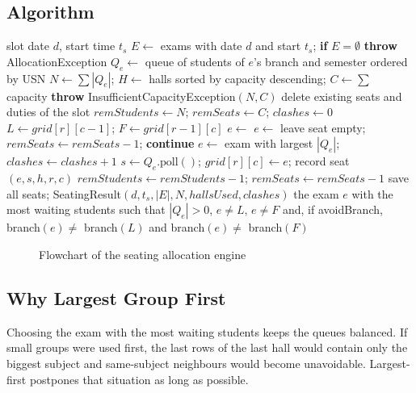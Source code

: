 \documentclass[11pt,a4paper]{article}
\begin{document}
\subsection{Algorithm}
\begin{algorithm}[H]
\caption{Greedy seating allocation for one slot}
\begin{algorithmic}[1]
\Require slot date $d$, start time $t_s$
\State $E \gets$ exams with date $d$ and start $t_s$; \textbf{if} $E = \emptyset$ \textbf{throw} AllocationException
 \State $Q_e \gets$ queue of students of $e$'s branch and semester ordered by USN \EndFor
\State $N \gets \sum |Q_e|$; $H \gets$ halls sorted by capacity descending; $C \gets \sum$ capacity
 \State \textbf{throw} InsufficientCapacityException$(N, C)$ \EndIf
\State delete existing seats and duties of the slot
\State $remStudents \gets N$; $remSeats \gets C$; $clashes \gets 0$
    \State $L \gets grid[r][c-1]$; $F \gets grid[r-1][c]$
    \State $e \gets$ 
     \State $e \gets$  \EndIf
        \State leave seat empty; $remSeats \gets remSeats - 1$; \textbf{continue} \EndIf
       \State $e \gets$ exam with largest $|Q_e|$; $clashes \gets clashes + 1$
    \EndIf
    \State $s \gets Q_e.\mathrm{poll}()$; $grid[r][c] \gets e$; record seat $(e, s, h, r, c)$
    \State $remStudents \gets remStudents - 1$; $remSeats \gets remSeats - 1$
  \EndFor
\EndFor
\State save all seats; \Return SeatingResult$(d, t_s, |E|, N, hallsUsed, clashes)$
\Statex
{}
  \State \Return the exam $e$ with the most waiting students such that $|Q_e| > 0$, $e \ne L$, $e \ne F$ and, if avoidBranch, branch$(e) \ne$ branch$(L)$ and branch$(e) \ne$ branch$(F)$
\EndFunction
\end{algorithmic}
\end{algorithm}

\begin{figure}[H]\centering
\resizebox{!}{0.62\textheight}{}
\caption{Flowchart of the seating allocation engine}
\end{figure}

\subsection{Why Largest Group First}
Choosing the exam with the most waiting students keeps the queues balanced. If small groups were used first, the last rows of the last hall would contain only the biggest subject and same-subject neighbours would become unavoidable. Largest-first postpones that situation as long as possible.
\end{document}
